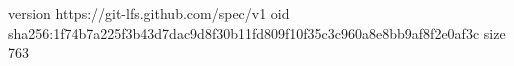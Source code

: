 version https://git-lfs.github.com/spec/v1
oid sha256:1f74b7a225f3b43d7dac9d8f30b11fd809f10f35c3c960a8e8bb9af8f2e0af3c
size 763

